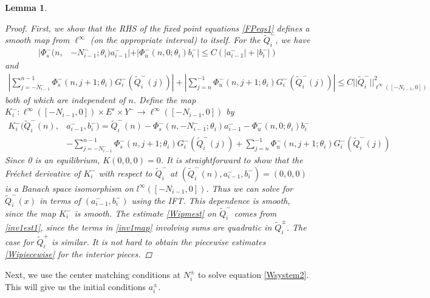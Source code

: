 \documentclass[12pt]{article}
\newtheorem{lemma}{Lemma}
\begin{document}
\begin{lemma}
\begin{proof}
First, we show that the RHS of the fixed point equations \eqref{FPeqs1} defines a smooth map from $\ell^\infty$ (on the appropriate interval) to itself. For the $\tilde{Q}_i^-$, we have
\begin{align}\label{inv1est1}
|\Phi_s^-(n, &-N_{i-1}^-; \theta_i) a_{i-1}^-| + |\Phi_u^-(n, 0; \theta_i) b_i^-| \leq C ( |a_{i-1}^-| + |b_i^-|) 
\end{align}
and
\begin{align*}
\left| \sum_{j = -N_{i-1}^-}^{n-1} \Phi_s^-(n, j+1; \theta_i) G_i^-(\tilde{Q}_i^-(j))\right| + \left|\sum_{j = n}^{-1} \Phi_u^-(n, j+1; \theta_i) G_i^-(\tilde{Q}_i^-(j))\right| 
\leq C ||\tilde{Q}_i^-||_{\ell^\infty([-N_{i-1}, 0])}^2 
\end{align*}
both of which are independent of $n$. Define the map
$K_i^-: \ell^\infty([-N_{i-1}, 0]) \times E^s \times Y^- \rightarrow \ell^\infty([-N_{i-1}, 0])$ by
\begin{align}\label{inv1map}
K_i^-(\tilde{Q}_i^-(n), &a_{i-1}^-, b_i^-) = \tilde{Q}_i^-(n) - \Phi_s^-(n, -N_{i-1}^-; \theta_i) a_{i-1}^- - \Phi_u^-(n, 0; \theta_i) b_i^-  \\
&- \sum_{j = -N_{i-1}^-}^{n-1} \Phi_s^-(n, j+1; \theta_i) G_i^-(\tilde{Q}_i^-(j)) + \sum_{j = n}^{-1} \Phi_u^-(n, j+1; \theta_i) G_i^-(\tilde{Q}_i^-(j)) \nonumber
\end{align}
Since 0 is an equilibrium, $K(0, 0, 0) = 0$. It is straightforward to show that the Fr\'echet derivative of $K_i^-$ with respect to $\tilde{Q}_i^-$ at $(\tilde{Q}_i^-(n), a_{i-1}^-, b_i^-) = (0, 0, 0)$ is a Banach space isomorphism on $l^\infty([-N_{i-1}, 0])$. Thus we can solve for $\tilde{Q}_i^-(x)$ in terms of $(a_{i-1}^-, b_i^-)$ using the IFT. This dependence is smooth, since the map $K_i^-$ is smooth. The estimate \eqref{Wipmest} on $\tilde{Q}_i^-$ comes from \eqref{inv1est1}, since the terms in \eqref{inv1map} involving sums are quadratic in $\tilde{Q}_i^\pm$. The case for $\tilde{Q}_i^+$ is similar. It is not hard to obtain the piecewise estimates \eqref{Wipiecewise} for the interior pieces.
\end{proof}
\end{lemma}

Next, we use the center matching conditions at $N_i^\pm$ to solve equation \ref{Wsystem2}. This will give us the initial conditions $a_i^\pm$.
\end{document}
